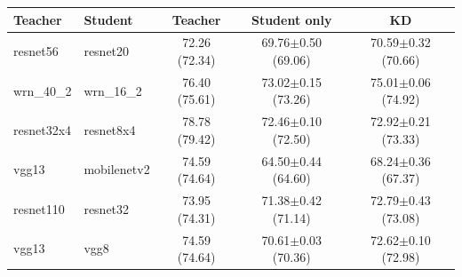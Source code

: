 \begin{tabular}{llccc}
\toprule
Teacher & Student & Teacher & Student only & KD \\
\midrule
resnet56 & resnet20 & 72.26 (72.34) & 69.76$\pm$0.50 (69.06) & 70.59$\pm$0.32 (70.66) \\
wrn\_40\_2 & wrn\_16\_2 & 76.40 (75.61) & 73.02$\pm$0.15 (73.26) & 75.01$\pm$0.06 (74.92) \\
resnet32x4 & resnet8x4 & 78.78 (79.42) & 72.46$\pm$0.10 (72.50) & 72.92$\pm$0.21 (73.33) \\
vgg13 & mobilenetv2 & 74.59 (74.64) & 64.50$\pm$0.44 (64.60) & 68.24$\pm$0.36 (67.37) \\
resnet110 & resnet32 & 73.95 (74.31) & 71.38$\pm$0.42 (71.14) & 72.79$\pm$0.43 (73.08) \\
vgg13 & vgg8 & 74.59 (74.64) & 70.61$\pm$0.03 (70.36) & 72.62$\pm$0.10 (72.98) \\
\bottomrule
\end{tabular}
